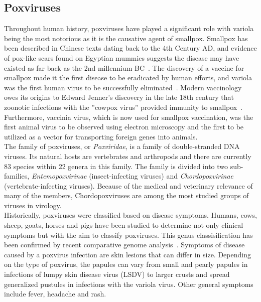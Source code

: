 \subsection{Poxviruses}
Throughout human history, poxviruses have played a significant role with variola being the most notorious as it is the causative agent of smallpox. Smallpox has been described in Chinese texts dating back to the 4th Century AD, and evidence of pox-like scars found on Egyptian mummies suggests the disease may have existed as far back as the 2nd millennium BC~\cite{fenner1988history}. The discovery of a vaccine for smallpox made it the first disease to be eradicated by human efforts, and variola was the first human virus to be successfully eliminated~\cite{fenner2000adventures}. Modern vaccinology owes its origins to Edward Jenner's discovery in the late 18th century that zoonotic infections with the ''cowpox virus'' provided immunity to smallpox~\cite{fenner1988history}. Furthermore, vaccinia virus, which is now used for smallpox vaccination, was the first animal virus to be observed using electron microscopy and the first to be utilized as a vector for transporting foreign genes into animals. \\
The family of poxviruses, or \textit{Poxviridae}, is a family of double-stranded DNA viruses. Its natural hosts are vertebrates and arthropods and there are currently 83 species within 22 genera in this family. The family is divided into two sub-families, \textit{Entemopoxvirinae} (insect-infecting viruses) and \textit{Chordopoxvirinae} (vertebrate-infecting viruses). Because of the medical and veterinary relevance of many of the members, Chordopoxviruses are among the most studied groups of viruses in virology. \\
Historically, poxviruses were classified based on disease symptoms. Humans, cows, sheep, goats, horses and pigs have been studied to determine not only clinical symptoms but with the aim to classify poxviruses. This genus classisification has been confirmed by recent comparative genome analysis~\cite{gubser2004poxvirus}. Symptoms of disease caused by a poxvirus infection are skin lesions that can differ in size. Depending on the type of poxvirus, the papules can vary from small and pearly papules in infections of lumpy skin disease virus (LSDV) to larger crusts and spread generalized pustules in infections with the variola virus. Other general symptoms include fever, headache and rash.

